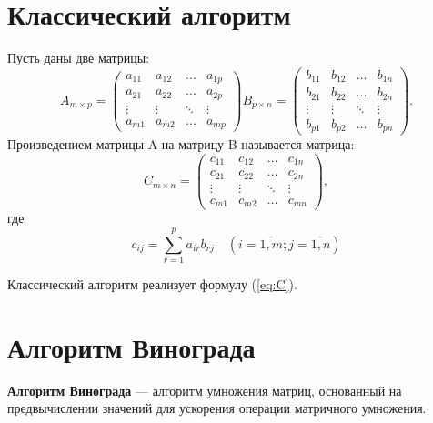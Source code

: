 \section{Классический алгоритм}
Пусть даны две матрицы:
\begin{equation}
	A_{m \times p} = 
	\begin{pmatrix}
		a_{11} & a_{12} & \ldots & a_{1p}\\
		a_{21} & a_{22} & \ldots & a_{2p}\\
		\vdots & \vdots & \ddots & \vdots\\
		a_{m1} & a_{m2} & \ldots & a_{mp}
	\end{pmatrix} 
	B_{p \times n} = 
	\begin{pmatrix}
		b_{11} & b_{12} & \ldots & b_{1n}\\
		b_{21} & b_{22} & \ldots & b_{2n}\\
		\vdots & \vdots & \ddots & \vdots\\
		b_{p1} & b_{p2} & \ldots & b_{pn}
	\end{pmatrix}.
\end{equation}
Произведением матрицы A на матрицу B называется матрица:
\begin{equation}
	\label{eq:C}
	C_{m \times n} = 
	\begin{pmatrix}
		c_{11} & c_{12} & \ldots & c_{1n}\\
		c_{21} & c_{22} & \ldots & c_{2n}\\
		\vdots & \vdots & \ddots & \vdots\\
		c_{m1} & c_{m2} & \ldots & c_{mn}
	\end{pmatrix},
\end{equation}
где 
\begin{equation}
	\label{eq:M}
	c_{ij} =
	\sum_{r=1}^{p} a_{ir}b_{rj} \quad (i=\overline{1,m}; j=\overline{1,n})
\end{equation}

Классический алгоритм реализует формулу (\ref{eq:C}).

\section{Алгоритм Винограда}

\textbf{Алгоритм Винограда} \cite{win_mat} --- алгоритм умножения матриц, основанный на предвычислении значений для ускорения операции матричного умножения.

